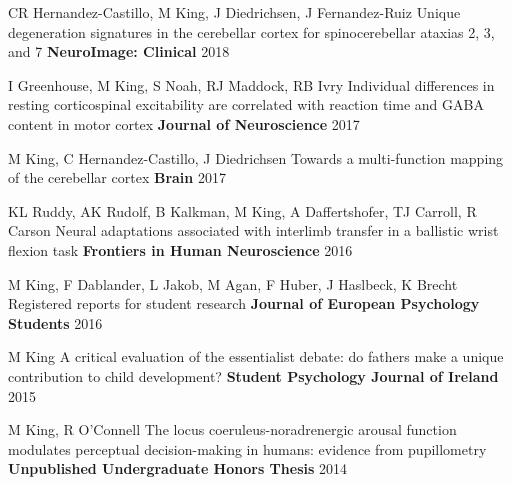 \begin{cventries}
  \cventry
    {CR Hernandez-Castillo, M King, J Diedrichsen, J Fernandez-Ruiz} %
    {Unique degeneration signatures in the cerebellar cortex for spinocerebellar ataxias 2, 3, and 7} %
    {\textbf{NeuroImage: Clinical}} %
    {2018} %
    {}
    
  \cventry
    {I Greenhouse, M King, S Noah, RJ Maddock, RB Ivry} %
    {Individual differences in resting corticospinal excitability are correlated with reaction time and GABA content in motor cortex} %
    {\textbf{Journal of Neuroscience}} %
    {2017} %
    {}
    
  \cventry
    {M King, C Hernandez-Castillo, J Diedrichsen} %
    {Towards a multi-function mapping of the cerebellar cortex} %
    {\textbf{Brain}} %
    {2017} %
    {}
    
  \cventry
    {KL Ruddy, AK Rudolf, B Kalkman, M King, A Daffertshofer, TJ Carroll, R Carson} %
    {Neural adaptations associated with interlimb transfer in a ballistic wrist flexion task} %
    {\textbf{Frontiers in Human Neuroscience}} %
    {2016} %
    {}
    
  \cventry
    {M King, F Dablander, L Jakob, M Agan, F Huber, J Haslbeck, K Brecht} %
    {Registered reports for student research} %
    {\textbf{Journal of European Psychology Students}} %
    {2016} %
    {}
    
  \cventry
    {M King} %
    {A critical evaluation of the essentialist debate: do fathers make a unique contribution to child development?} %
    {\textbf{Student Psychology Journal of Ireland}} %
    {2015} %
    {}
    
  \cventry
    {M King, R O'Connell} %
    {The locus coeruleus-noradrenergic arousal function modulates perceptual decision-making in humans: evidence from pupillometry} %
    {\textbf{Unpublished Undergraduate Honors Thesis}} %
    {2014} %
    {}

\end{cventries}